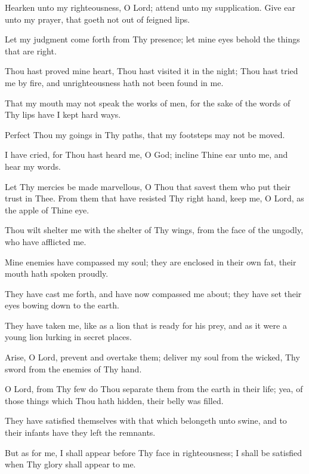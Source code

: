 Hearken unto my righteousness, O Lord; attend unto my supplication. Give ear unto my prayer, that goeth not out of feigned lips.

Let my judgment come forth from Thy presence; let mine eyes behold the things that are right.

Thou hast proved mine heart, Thou hast visited it in the night; Thou hast tried me by fire, and unrighteousness hath not been found in me.

That my mouth may not speak the works of men, for the sake of the words of Thy lips have I kept hard ways.

Perfect Thou my goings in Thy paths, that my footsteps may not be moved.

I have cried, for Thou hast heard me, O God; incline Thine ear unto me, and hear my words.

Let Thy mercies be made marvellous, O Thou that savest them who put their trust in Thee. From them that have resisted Thy right hand, keep me, O Lord, as the apple of Thine eye.

Thou wilt shelter me with the shelter of Thy wings, from the face of the ungodly, who have afflicted me.

Mine enemies have compassed my soul; they are enclosed in their own fat, their mouth hath spoken proudly.

They have cast me forth, and have now compassed me about; they have set their eyes bowing down to the earth.

They have taken me, like as a lion that is ready for his prey, and as it were a young lion lurking in secret places.

Arise, O Lord, prevent and overtake them; deliver my soul from the wicked, Thy sword from the enemies of Thy hand.

O Lord, from Thy few do Thou separate them from the earth in their life; yea, of those things which Thou hath hidden, their belly was filled.

They have satisfied themselves with that which belongeth unto swine, and to their infants have they left the remnants.

But as for me, I shall appear before Thy face in righteousness; I shall be satisfied when Thy glory shall appear to me.
